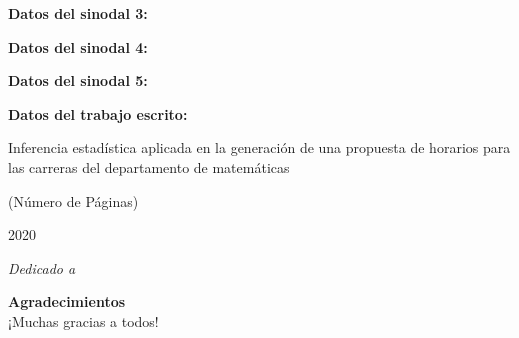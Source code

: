 \textbf{Datos del sinodal 3:}




\textbf{Datos del sinodal 4:}




\textbf{Datos del sinodal 5:}




\textbf{Datos del trabajo escrito:}

Inferencia estadística aplicada en la generación de una propuesta de horarios para las carreras del departamento de matemáticas

(Número de Páginas)

2020




\newpage %
\thispagestyle{empty} %

\begin{flushright}
\textit{Dedicado a \\}
\end{flushright}

\newpage %
\thispagestyle{empty} %

\textbf{\Huge{Agradecimientos}}\\
 
¡Muchas gracias a todos!

\newpage %
\thispagestyle{empty} %

\tableofcontents %
\listoffigures %
\listoftables %
\lstlistoflistings %

